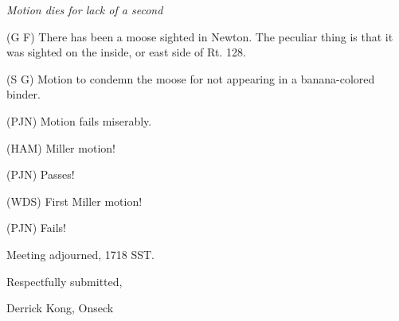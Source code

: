 {\em Motion dies for lack of a second}

(G F) There has been a moose sighted in Newton.  The peculiar thing is
that it was sighted on the inside, or east side of Rt. 128. 

(S G) Motion to condemn the moose for not appearing in a banana-colored
binder.

(PJN) Motion fails miserably.

(HAM) Miller motion!

(PJN) Passes!

(WDS) First Miller motion!

(PJN) Fails!

Meeting adjourned, 1718 SST.

\vspace{0.15in} 
\begin{center}
Respectfully submitted,

Derrick Kong, Onseck
\end{center}

